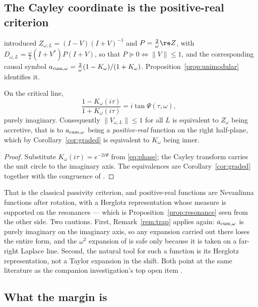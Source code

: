 \subsection{The Cayley coordinate is the positive-real criterion}

\cite{CumulativePath} introduced $Z_{\omega,L}=(I-V)(I+V)^{-1}$ and
$P=\frac2\omega\re Z$, with $D_{\omega,L}=\frac\omega2(I+V^*)P(I+V)$, so that
$P\succeq0\iff\lVert V\rVert\leq1$, and the corresponding causal symbol
$a_{\rm cum,\omega}=\frac2\omega(1-K_\omega)/(1+K_\omega)$.
Proposition~\ref{prop:unimodular} identifies it.

\begin{proposition}[Reactance]\label{prop:cayley}
On the critical line,
\[
 \frac{1-K_\omega(i\tau)}{1+K_\omega(i\tau)}=i\tan\Psi(\tau,\omega),
\]
purely imaginary. Consequently $\lVert V_{\omega,L}\rVert\leq1$ for all $L$ is
equivalent to $Z_\omega$ being accretive, that is to $a_{\rm cum,\omega}$ being a
\emph{positive-real} function on the right half-plane, which by
Corollary~\ref{cor:graded} is equivalent to $K_\omega$ being inner.
\end{proposition}

\begin{proof}
Substitute $K_\omega(i\tau)=e^{-2i\Psi}$ from \eqref{eq:phase}; the Cayley
transform carries the unit circle to the imaginary axis. The equivalences are
Corollary~\ref{cor:graded} together with the congruence of
\cite{CumulativePath}.
\end{proof}

That is the classical passivity criterion, and positive-real functions are
Nevanlinna functions after rotation, with a Herglotz representation whose measure
is supported on the resonances --- which is Proposition~\ref{prop:resonance} seen
from the other side. Two cautions. First, Remark~\ref{rem:trap} applies again:
$a_{\rm cum,\omega}$ is purely imaginary on the imaginary axis, so any expansion
carried out there loses the entire form, and the $\omega^2$ expansion of
\cite{CumulativePath} is safe only because it is taken on a far-right Laplace
line. Second, the natural tool for such a function is its Herglotz
representation, not a Taylor expansion in the shift. Both point at the same
literature as the companion investigation's top open item \cite{SuzukiDeBranges}.

\subsection{What the margin is}

